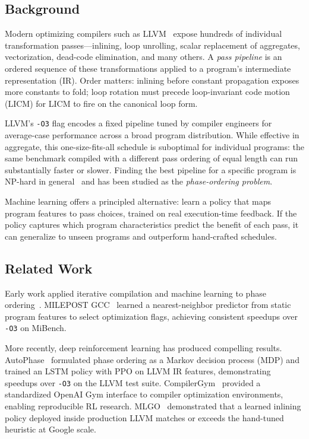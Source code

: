 \documentclass[conference]{IEEEtran}
\begin{document}
\subsection{Background}

Modern optimizing compilers such as LLVM~\cite{lattner2004llvm} expose
hundreds of individual transformation passes---inlining, loop unrolling,
scalar replacement of aggregates, vectorization, dead-code elimination, and
many others.  A \emph{pass pipeline} is an ordered sequence of these
transformations applied to a program's intermediate representation (IR).
Order matters: inlining before constant propagation exposes more constants to
fold; loop rotation must precede loop-invariant code motion (LICM) for LICM to
fire on the canonical loop form.

LLVM's \texttt{-O3} flag encodes a fixed pipeline tuned by compiler engineers
for average-case performance across a broad program distribution.  While
effective in aggregate, this one-size-fits-all schedule is suboptimal for
individual programs: the same benchmark compiled with a different pass ordering
of equal length can run substantially faster or slower.  Finding the best
pipeline for a specific program is NP-hard in general~\cite{almagor2004finding}
and has been studied as the \emph{phase-ordering problem}.

Machine learning offers a principled alternative: learn a policy that maps
program features to pass choices, trained on real execution-time feedback.  If
the policy captures which program characteristics predict the benefit of each
pass, it can generalize to unseen programs and outperform hand-crafted
schedules.

\subsection{Related Work}

Early work applied iterative compilation and machine learning to phase
ordering~\cite{fursin2011milepost,ashouri2017micomp}.  MILEPOST
GCC~\cite{fursin2011milepost} learned a nearest-neighbor predictor from static
program features to select optimization flags, achieving consistent speedups
over \texttt{-O3} on MiBench.

More recently, deep reinforcement learning has produced compelling results.
AutoPhase~\cite{huang2019autophase} formulated phase ordering as a Markov
decision process (MDP) and trained an LSTM policy with PPO on LLVM IR features,
demonstrating speedups over \texttt{-O3} on the LLVM test suite.
CompilerGym~\cite{cummins2021compilergym} provided a standardized OpenAI Gym
interface to compiler optimization environments, enabling reproducible RL
research.  MLGO~\cite{trofin2021mlgo} demonstrated that a learned inlining
policy deployed inside production LLVM matches or exceeds the hand-tuned
heuristic at Google scale.
\end{document}
